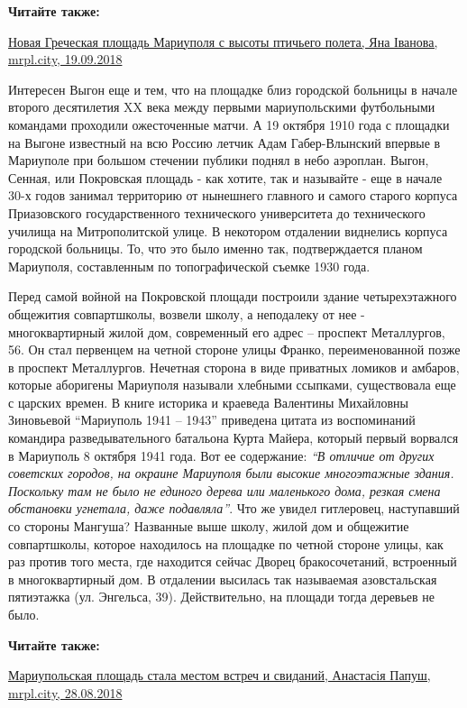 \textbf{Читайте также:} 

\href{https://mrpl.city/news/view/novaya-grecheskaya-ploshhad-mariupolya-s-vysoty-ptichego-poleta-foto}{Новая Греческая площадь Мариуполя с высоты птичьего полета, Яна Іванова, mrpl.city, 19.09.2018}

Интересен Выгон еще и тем, что на площадке близ городской больницы в начале
второго десятилетия XX века между первыми мариупольскими  футбольными командами
проходили ожесточенные матчи.  А 19 октября 1910 года с площадки на  Выгоне
известный на всю Россию летчик Адам Габер-Влынский впервые в Мариуполе при
большом стечении публики поднял в небо аэроплан. Выгон, Сенная, или Покровская
площадь - как хотите, так и называйте - еще в начале 30-х годов занимал
территорию от нынешнего главного и самого старого корпуса Приазовского
государственного технического университета до технического училища на
Митрополитской улице. В некотором отдалении виднелись корпуса городской
больницы. То, что это было именно так, подтверждается планом Мариуполя,
составленным по топографической съемке 1930 года. 

Перед самой войной на Покровской площади построили здание четырехэтажного
общежития совпартшколы, возвели школу, а неподалеку от нее - многоквартирный
жилой дом, современный его адрес – проспект Металлургов, 56. Он стал первенцем
на четной стороне улицы Франко, переименованной позже в проспект Металлургов.
Нечетная сторона в виде приватных ломиков и амбаров, которые аборигены
Мариуполя называли хлебными ссыпками, существовала еще с царских времен. В
книге историка и краеведа Валентины Михайловны Зиновьевой \enquote{Мариуполь 1941 –
1943} приведена цитата из воспоминаний командира разведывательного батальона
Курта Майера, который первый ворвался в Мариуполь 8 октября 1941 года. Вот ее
содержание: \emph{\enquote{В отличие от других советских городов, на окраине Мариуполя были
высокие многоэтажные здания. Поскольку там не было не единого дерева или
маленького дома, резкая смена обстановки угнетала, даже подавляла}}. Что же
увидел гитлеровец, наступавший со стороны Мангуша? Названные выше школу, жилой
дом и общежитие совпартшколы, которое находилось на площадке по четной стороне
улицы, как раз против того места, где находится сейчас Дворец бракосочетаний,
встроенный  в  многоквартирный дом. В отдалении высилась так называемая
азовстальская пятиэтажка (ул. Энгельса, 39).  Действительно, на площади тогда
деревьев не было.

\textbf{Читайте также:}

\href{https://mrpl.city/news/view/mariupolskaya-ploshhad-stala-mestom-vstrech-i-svidanij-foto}{%
Мариупольская площадь стала местом встреч и свиданий, Анастасія Папуш, mrpl.city, 28.08.2018}

